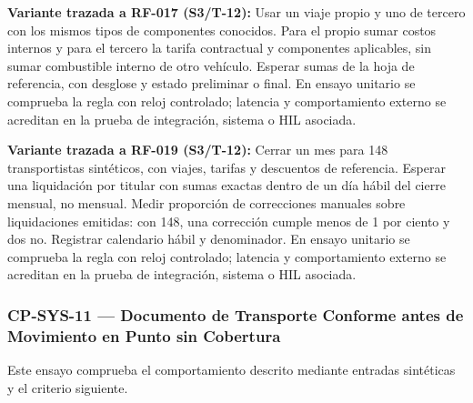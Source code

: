 \par\noindent\textbf{Variante trazada a RF-017 (S3/T-12):} Usar un viaje propio y uno de tercero con los mismos tipos de componentes conocidos. Para el propio sumar costos internos y para el tercero la tarifa contractual y componentes aplicables, sin sumar combustible interno de otro vehículo. Esperar sumas de la hoja de referencia, con desglose y estado preliminar o final. En ensayo unitario se comprueba la regla con reloj controlado; latencia y comportamiento externo se acreditan en la prueba de integración, sistema o HIL asociada.\par

\par\noindent\textbf{Variante trazada a RF-019 (S3/T-12):} Cerrar un mes para 148 transportistas sintéticos, con viajes, tarifas y descuentos de referencia. Esperar una liquidación por titular con sumas exactas dentro de un día hábil del cierre mensual, no mensual. Medir proporción de correcciones manuales sobre liquidaciones emitidas: con 148, una corrección cumple menos de 1 por ciento y dos no. Registrar calendario hábil y denominador. En ensayo unitario se comprueba la regla con reloj controlado; latencia y comportamiento externo se acreditan en la prueba de integración, sistema o HIL asociada.\par
\subsubsection*{CP-SYS-11 — Documento de Transporte Conforme antes de Movimiento en Punto sin Cobertura}\label{sec:9-cp-sys-11}
Este ensayo comprueba el comportamiento descrito mediante entradas sintéticas y el criterio siguiente.

